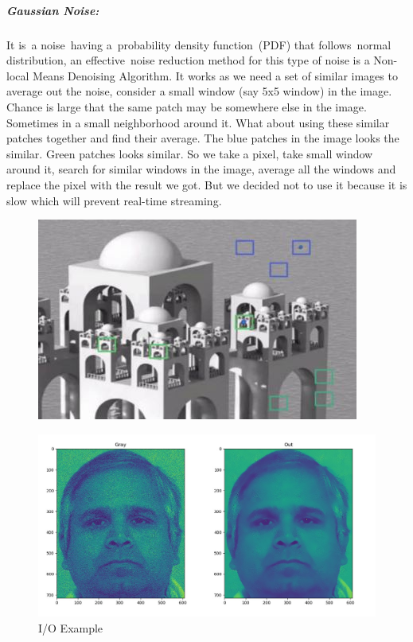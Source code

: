 \subparagraph{Gaussian Noise:}
It is a noise having a probability density function (PDF) that follows normal distribution, an effective noise reduction method for this type of noise is a Non-local Means Denoising Algorithm.\newline
It works as we need a set of similar images to average out the noise, consider a small window (say 5x5 window) in the image. Chance is large that the same patch may be somewhere else in the image. Sometimes in a small neighborhood around it. What about using these similar patches together and find their average.\newline
The blue patches in the image looks the similar. Green patches looks similar. So we take a pixel, take small window around it, search for similar windows in the image, average all the windows and replace the pixel with the result we got.\newline
But we decided not to use it because it is slow which will prevent real-time streaming.
\begin{figure}[H]
	\centering
	\includegraphics[width=\linewidth]{images/nlmd.jpg}
\end{figure}

\begin{figure}[H]
	\centering
	\includegraphics[width=\linewidth]{images/gaussian.jpg}
	\caption{I/O Example}
\end{figure}

